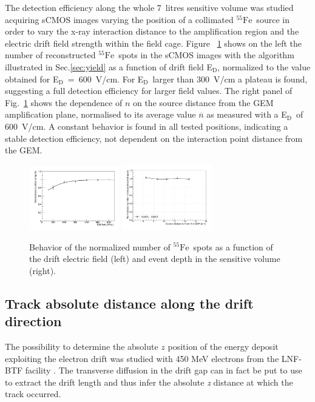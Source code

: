 \documentclass[physics,article,submit,moreauthors,pdftex]{Definitions/mdpi}
\newcommand{\fe}{\ensuremath{^{55}\textrm{Fe}}\xspace}
\newcommand{\Ed}  {E$_{\mathrm{D}}$\xspace}
\begin{document}
The detection efficiency along the whole 7~litres sensitive volume was studied acquiring sCMOS images varying the position of a collimated \fe\ source in order to vary the x-ray interaction distance to the amplification region and the electric drift field strength within the field cage. Figure ~\ref{fig:deteff} shows on the left the number of reconstructed \fe\ spots in the sCMOS images with the algorithm illustrated in Sec.\ref{sec:yield} as a function of drift field \Ed, normalized to the value obtained for \Ed~=~600~V/cm. For \Ed\ larger than 300~V/cm a plateau is found, suggesting  a full detection efficiency for larger field values. The right panel of Fig.~\ref{fig:deteff} shows the dependence of $n$ on the source distance from the GEM amplification plane, normalised to its average value $\overline{n}$ as measured with a \Ed\ of 600~V/cm. A constant behavior is found in all tested positions, indicating a stable detection efficiency, not dependent on the interaction point distance from the GEM.

\begin{figure}[t!]
\centering
\includegraphics[width=0.35\textwidth]{gEff_Edrift_mod.pdf}
\includegraphics[width=0.35\textwidth]{feZscan6040_wo_4.pdf}
\caption{Behavior of the normalized number of \fe~spots as a function of the drift electric field (left) and event depth in the sensitive volume (right).} 
\label{fig:deteff}
\end{figure}


\subsection{Track absolute distance along the drift direction}\label{sec:track}
The possibility to determine the absolute $z$ position of the energy deposit exploiting the electron drift was studied with 450 MeV electrons from the LNF-BTF facility \cite{bib:lemon_btf}. The  transverse diffusion in the drift gap can in fact be put to use to extract the drift length and thus infer the absolute {\it z} distance at which the track occurred. 
\end{document}
